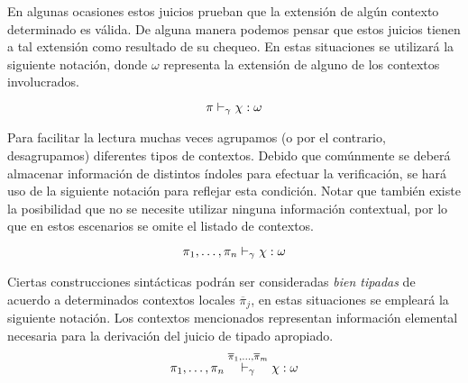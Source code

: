 En algunas ocasiones estos juicios prueban que la extensión de algún contexto determinado es válida.
De alguna manera podemos pensar que estos juicios tienen a tal extensión como resultado de su chequeo.
En estas situaciones se utilizará la siguiente notación, donde $\omega$ representa la extensión de alguno de los contextos involucrados.
\begin{gather*}
\pi \DASH{\gamma} \chi : \omega
\end{gather*}

Para facilitar la lectura muchas veces agrupamos (o por el contrario, desagrupamos) diferentes tipos de contextos.
Debido que comúnmente se deberá almacenar información de distintos índoles para efectuar la verificación, se hará uso de la siguiente notación para reflejar esta condición.
Notar que también existe la posibilidad que no se necesite utilizar ninguna información contextual, por lo que en estos escenarios se omite el listado de contextos.
\begin{gather*}
\pi_1, \ldots, \pi_n \DASH{\gamma} \chi : \omega
\end{gather*}

Ciertas construcciones sintácticas podrán ser consideradas \textit{bien tipadas} de acuerdo a determinados contextos locales $\overline{\pi}_{j}$, en estas situaciones se empleará la siguiente notación.
Los contextos mencionados representan información elemental necesaria para la derivación del juicio de tipado apropiado.
\begin{gather*}
\pi_1, \ldots, \pi_n \DASH[\overline{\pi}_{1}, \ldots, \overline{\pi}_{m}]{\gamma} \chi : \omega
\end{gather*}

